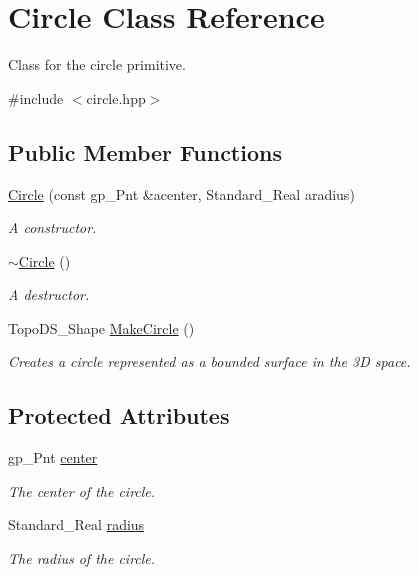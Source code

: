 \hypertarget{class_circle}{
\section{Circle Class Reference}
\label{class_circle}
}


Class for the circle primitive.  




{\ttfamily \#include $<$circle.hpp$>$}

\subsection*{Public Member Functions}
\begin{DoxyCompactItemize}
\item 
\hyperlink{class_circle_a194f1acb83760f0e1915d63a4348b0da}{Circle} (const gp\_\-Pnt \&acenter, Standard\_\-Real aradius)
\begin{DoxyCompactList}\small\item\em A constructor. \item\end{DoxyCompactList}\item 
\hyperlink{class_circle_ae3f30436e645d73e368e8ee55f8d1650}{$\sim$Circle} ()
\begin{DoxyCompactList}\small\item\em A destructor. \item\end{DoxyCompactList}\item 
TopoDS\_\-Shape \hyperlink{class_circle_abb2c1eab9855a9bd2547613dc12b4748}{MakeCircle} ()
\begin{DoxyCompactList}\small\item\em Creates a circle represented as a bounded surface in the 3D space. \item\end{DoxyCompactList}\end{DoxyCompactItemize}
\subsection*{Protected Attributes}
\begin{DoxyCompactItemize}
\item 
gp\_\-Pnt \hyperlink{class_circle_a1b98a2fa0e78d5cccdffc723e0cd0ca8}{center}
\begin{DoxyCompactList}\small\item\em The center of the circle. \item\end{DoxyCompactList}\item 
Standard\_\-Real \hyperlink{class_circle_ab0935c62cf4fb06e85925a67f1fd7d1c}{radius}
\begin{DoxyCompactList}\small\item\em The radius of the circle. \item\end{DoxyCompactList}\end{DoxyCompactItemize}


